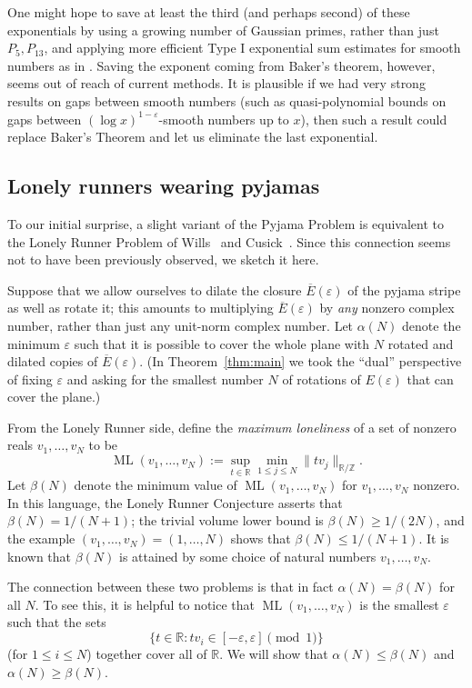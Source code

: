 \documentclass[11pt]{amsart}
\theoremstyle{definition}
\DeclareMathOperator{\ML}{ML}
\begin{document}
One might hope to save at least the third (and perhaps second) of these exponentials by using a growing number of Gaussian primes, rather than just $P_5, P_{13}$, and applying more efficient Type I exponential sum estimates for smooth numbers as in \cite{DS24}. Saving the exponent coming from Baker's theorem, however, seems out of reach of current methods. It is plausible if we had very strong results on gaps between smooth numbers (such as quasi-polynomial bounds on gaps between $(\log x)^{1 - \varepsilon}$-smooth numbers up to $x$), then such a result could replace Baker's Theorem and let us eliminate the last exponential.


\subsection{Lonely runners wearing pyjamas}

To our initial surprise, a slight variant of the Pyjama Problem is equivalent to the Lonely Runner Problem of Wills~\cite{wills1967zwei} and Cusick~\cite{cusick1972view}.  Since this connection seems not to have been previously observed, we sketch it here.

Suppose that we allow ourselves to dilate the closure $\overline{E}(\varepsilon)$ of the pyjama stripe  as well as rotate it; this amounts to multiplying $\overline{E}(\varepsilon)$ by \emph{any} nonzero complex number, rather than just any unit-norm complex number.  Let $\alpha(N)$ denote the minimum $\varepsilon$ such that it is possible to cover the whole plane with $N$ rotated and dilated copies of $\overline{E}(\varepsilon)$.  (In Theorem~\ref{thm:main} we took the ``dual'' perspective of fixing $\varepsilon$ and asking for the smallest number $N$ of rotations of $E(\varepsilon)$ that can cover the plane.)

From the Lonely Runner side, define the \emph{maximum loneliness} of a set of nonzero reals $v_1, \ldots, v_N$  to be $$\ML(v_1, \ldots, v_N):=\sup_{t \in \mathbb{R}} \min_{1 \leq j \leq N} \|tv_j\|_{\mathbb{R}/\mathbb{Z}}.$$
Let $\beta(N)$ denote the minimum value of $\ML(v_1, \ldots, v_N)$ for $v_1, \ldots, v_N$ nonzero.  In this language, the Lonely Runner Conjecture asserts that $\beta(N)=1/(N+1)$; the trivial volume lower bound is $\beta(N) \geq 1/(2N)$, and the example $(v_1, \ldots, v_N)=(1,\ldots, N)$ shows that $\beta(N) \leq 1/(N+1)$.  It is known that $\beta(N)$ is attained by some choice of natural numbers $v_1, \ldots, v_N$.

The connection between these two problems is that in fact $\alpha(N)=\beta(N)$ for all $N$.  To see this, it is helpful to notice that $\ML(v_1, \ldots, v_N)$ is the smallest $\varepsilon$ such that the sets $$\{t \in \mathbb{R}: tv_i \in [-\varepsilon,\varepsilon] \pmod{1}\}$$ (for $1 \leq i \leq N$) together cover all of $\mathbb{R}$.  We will show that $\alpha(N) \leq \beta(N)$ and $\alpha(N) \geq \beta(N)$.
\end{document}
